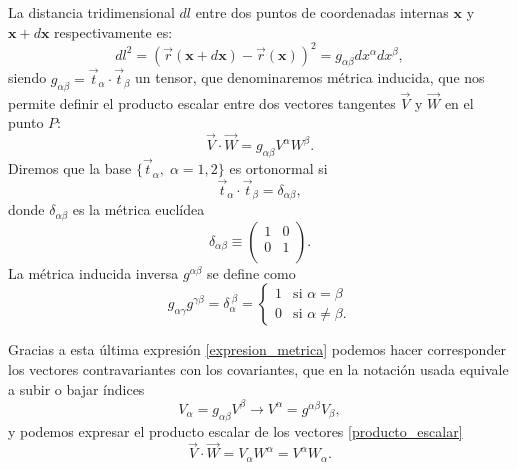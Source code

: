 La distancia tridimensional $dl$ entre dos puntos de coordenadas internas
$\mathbf{x}$ y $\mathbf{x}+d\mathbf{x}$ respectivamente es:
\begin{equation}\label{elemento_linea}
dl^2=(\vec{r}(\mathbf{x}+d\mathbf{x})-\vec{r}(\mathbf{x}))^2=g_{\alpha\beta}dx^{\alpha}dx^{\beta},
\end{equation}
siendo $g_{\alpha\beta}=\vec{t}_{\alpha}\cdot\vec{t}_{\beta}$ un tensor, que
denominaremos métrica inducida, que nos permite definir el producto escalar
entre dos vectores tangentes $\vec{V}$ y $\vec{W}$ en el punto $P$:
\begin{equation}\label{producto_escalar}
\vec{V}\cdot\vec{W}=g_{\alpha\beta}V^{\alpha}W^{\beta}.
\end{equation}
Diremos que la base $\{ \vec{t}_{\alpha},\; \alpha=1,2\}$ es ortonormal si
\begin{equation*}
\vec{t}_{\alpha}\cdot\vec{t}_{\beta}=\delta_{\alpha\beta},
\end{equation*}
donde $\delta_{\alpha\beta}$ es la métrica euclídea 
\begin{equation*}
\delta_{\alpha\beta}\equiv\left(\begin{array}{cc}
1&0\\
0&1\\
\end{array}\right).
\end{equation*}
La métrica inducida inversa $g^{\alpha\beta}$ se define como
\begin{equation}\label{expresion_metrica}
g_{\alpha\gamma}g^{\gamma\beta}=\delta_{\alpha}^{\ \beta}=\begin{cases}
1&\text{si $\alpha=\beta$}\\
0&\text{si $\alpha\neq\beta$}.
\end{cases}
\end{equation}

Gracias a esta última expresión \eqref{expresion_metrica} podemos hacer
corresponder los vectores contravariantes con los covariantes, que en la
notación usada equivale a subir o bajar índices
\begin{equation*}
V_{\alpha}=g_{\alpha\beta}V^{\beta}\rightarrow V^{\alpha}=g^{\alpha\beta}V_{\beta}, 
\end{equation*}
y podemos expresar el producto escalar de los vectores
\eqref{producto_escalar} 
\begin{equation*}
\vec{V}\cdot\vec{W}=V_{\alpha}W^{\alpha}=V^{\alpha}W_{\alpha}.
\end{equation*}

